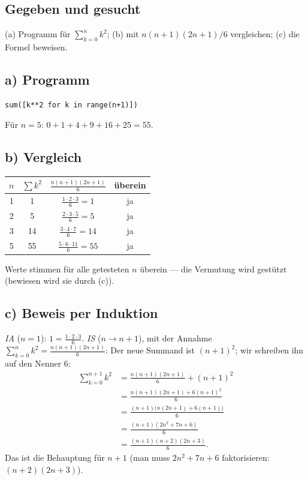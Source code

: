 

\subsection*{Gegeben und gesucht}
(a) Programm für $\sum_{k=0}^{n}k^2$; (b) mit $n(n+1)(2n+1)/6$
vergleichen; (c) die Formel beweisen.

\subsection*{a) Programm}
\begin{verbatim}
sum([k**2 for k in range(n+1)])
\end{verbatim}
Für $n=5$: $0+1+4+9+16+25=55$. \checkmark

\subsection*{b) Vergleich}
\begin{center}
\begin{tabular}{c|ccc}
$n$ & $\sum k^2$ & $\frac{n(n+1)(2n+1)}6$ & überein\\
\hline
1 & 1 & $\frac{1\cdot2\cdot3}{6}=1$ & ja\\
2 & 5 & $\frac{2\cdot3\cdot5}{6}=5$ & ja\\
3 & 14 & $\frac{3\cdot4\cdot7}{6}=14$ & ja\\
5 & 55 & $\frac{5\cdot6\cdot11}{6}=55$ & ja
\end{tabular}
\end{center}
Werte stimmen für alle getesteten $n$ überein --- die Vermutung wird
gestützt (bewiesen wird sie durch (c)).

\subsection*{c) Beweis per Induktion}
\emph{IA} ($n=1$): $1=\frac{1\cdot2\cdot3}6$. \checkmark
\emph{IS} ($n\to n+1$), mit der Annahme
$\sum_{k=0}^{n}k^2=\frac{n(n+1)(2n+1)}6$: Der neue Summand ist
$(n+1)^2$; wir schreiben ihn auf den Nenner $6$:
\begin{align}
  \sum_{k=0}^{n+1}k^2
  &=\frac{n(n+1)(2n+1)}6+(n+1)^2 \\
  &=\frac{n(n+1)(2n+1)+6(n+1)^2}{6} \\
  &=\frac{(n+1)\bigl(n(2n+1)+6(n+1)\bigr)}6 \\
  &=\frac{(n+1)(2n^2+7n+6)}6 \\
  &=\frac{(n+1)(n+2)(2n+3)}6 .
\end{align}
Das ist die Behauptung für $n+1$ (man muss $2n^2+7n+6$
faktorisieren: $(n+2)(2n+3)$).

